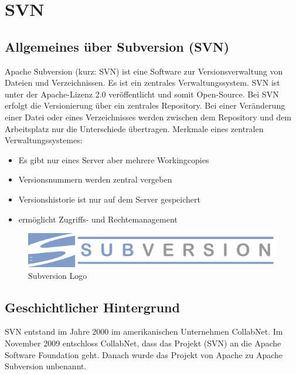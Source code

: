 \section{SVN}
\subsection{Allgemeines  \"uber Subversion (SVN)}
Apache Subversion (kurz: SVN) ist eine Software zur Versionsverwaltung von Dateien und Verzeichnissen. Es ist ein zentrales Verwaltungssystem. SVN ist unter der Apache-Lizenz 2.0 ver\"offentlicht und somit Open-Source. Bei SVN erfolgt die Versionierung \"uber ein zentrales Repository. Bei einer Ver\"anderung einer Datei oder eines Verzeichnisses werden zwischen dem Repository und dem Arbeitsplatz nur die Unterschiede \"ubertragen. Merkmale eines zentralen Verwaltungssystemes:
\begin{itemize}
    \item Es gibt nur eines Server aber mehrere Workingcopies
    \item Versionsnummern werden zentral vergeben
    \item Versionshistorie ist nur auf dem Server gespeichert
    \item erm\"oglicht Zugriffs- und Rechtemanagement
\end{itemize}

\begin{figure}[h!]
\centering
\includegraphics[width=\textwidth]{subversion_logo.png}
\caption{Subversion Logo}
\label{fig:SVlogo}
\end{figure}

\subsection{Geschichtlicher Hintergrund}
SVN entstand im Jahre 2000 im amerikanischen Unternehmen CollabNet.
Im November 2009 entschloss CollabNet, dass das Projekt (SVN) an die Apache Software Foundation geht. Danach wurde das Projekt von Apache zu Apache Subversion unbenannt.


